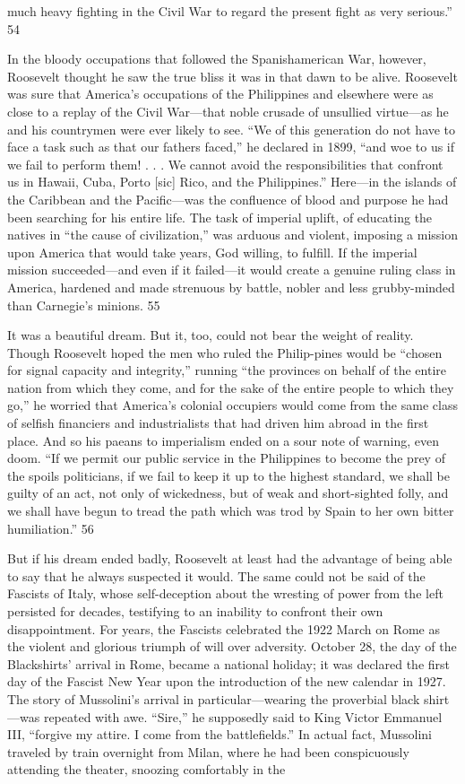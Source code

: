 much heavy fighting in the Civil War to regard the present fight as very serious.” {\color{blue} 54 } {\par} In the bloody occupations that followed the Spanishamerican War, however, Roosevelt thought he saw the true bliss it was in that dawn to be alive. Roosevelt was sure that America’s occupations of the Philippines and elsewhere were as close to a replay of the Civil War—that noble crusade of unsullied virtue—as he and his countrymen were ever likely to see. “We of this generation do not have to face a task such as that our fathers faced,” he declared in 1899, “and woe to us if we fail to perform them! . . . We cannot avoid the responsibilities that confront us in Hawaii, Cuba, Porto [sic] Rico, and the Philippines.” Here—in the islands of the Caribbean and the Pacific—was the confluence of blood and purpose he had been searching for his entire life. The task of imperial uplift, of educating the natives in “the cause of civilization,” was arduous and violent, imposing a mission upon America that would take years, God willing, to fulfill. If the imperial mission succeeded—and even if it failed—it would create a genuine ruling class in America, hardened and made strenuous by battle, nobler and less grubby-minded than Carnegie’s minions. {\color{blue} 55 } {\par} It was a beautiful dream. But it, too, could not bear the weight of reality. Though Roosevelt hoped the men who ruled the Philip-pines would be “chosen for signal capacity and integrity,” running “the provinces on behalf of the entire nation from which they come, and for the sake of the entire people to which they go,” he worried that America’s colonial occupiers would come from the same class of selfish financiers and industrialists that had driven him abroad in the first place. And so his paeans to imperialism ended on a sour note of warning, even doom. “If we permit our public service in the Philippines to become the prey of the spoils politicians, if we fail to keep it up to the highest standard, we shall be guilty of an act, not only of wickedness, but of weak and short-sighted folly, and we shall have begun to tread the path which was trod by Spain to her own bitter humiliation.” {\color{blue} 56 } {\par} But if his dream ended badly, Roosevelt at least had the advantage of being able to say that he always suspected it would. The same could not be said of the Fascists of Italy, whose self-deception about the wresting of power from the left persisted for decades, testifying to an inability to confront their own disappointment. For years, the Fascists celebrated the 1922 March on Rome as the violent and glorious triumph of will over adversity. October 28, the day of the Blackshirts’ arrival in Rome, became a national holiday; it was declared the first day of the Fascist New Year upon the introduction of the new calendar in 1927. The story of Mussolini’s arrival in particular—wearing the proverbial black shirt—was repeated with awe. “Sire,” he supposedly said to King Victor Emmanuel III, “forgive my attire. I come from the battlefields.” In actual fact, Mussolini traveled by train overnight from Milan, where he had been conspicuously attending the theater, snoozing comfortably in the 